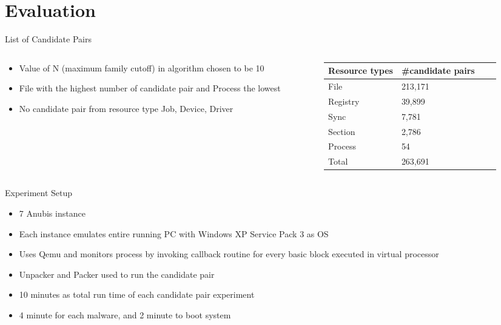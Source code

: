 \documentclass{beamer}
\begin{document}
\section{Evaluation}
\label{sec:Evaluation}
\begin{frame}[t]{List of Candidate Pairs}
\begin{columns}
\begin{column}{4.7cm}
\begin{itemize}
  \item Value of N (maximum family cutoff) in algorithm chosen to be 10
  \item File with the highest number of candidate pair and Process the lowest
  \item No candidate pair from resource type Job, Device, Driver
\end{itemize}
\end{column}
\begin{column}{5.3cm}
  \begin{tabular}{l l l l}
    \toprule
    Resource types & \#candidate pairs\\
    \midrule
    File & 213,171 \\
    Registry & 39,899 \\
    Sync & 7,781 \\
    Section & 2,786 \\
    Process & 54\\
    \bottomrule
    Total & 263,691\\
  \end{tabular}
\end{column}
\end{columns}
\end{frame}
\begin{frame}[t]{Experiment Setup}
  \begin{itemize}
    \item 7 Anubis instance
    \item Each instance emulates entire running PC with Windows XP Service Pack 3 as OS
    \item Uses Qemu and monitors process by invoking callback routine for every basic block executed in virtual processor
    \item Unpacker and Packer used to run the candidate pair
    \item 10 minutes as total run time of each candidate pair experiment
    \item 4 minute for each malware, and 2 minute to boot system
  \end{itemize}
\end{frame}
\end{document}

